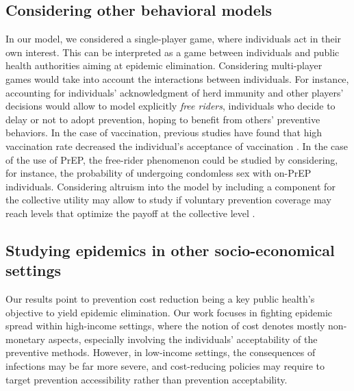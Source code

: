 \subsection{Considering other behavioral models}
In our model, we considered a single-player game, where individuals act in their own interest. This can be interpreted as a game between individuals and public health authorities aiming at epidemic elimination. Considering multi-player games would take into account the interactions between individuals. For instance, accounting for individuals' acknowledgment of herd immunity and other players' decisions would allow to model explicitly \textit{free riders}, individuals who decide to delay or not to adopt prevention, hoping to benefit from others' preventive behaviors. In the case of vaccination, previous studies have found that high vaccination rate decreased the individual's acceptance of vaccination \cite[]{Ibuka2014}. In the case of the use of PrEP, the free-rider phenomenon could be studied by considering, for instance, the probability of undergoing condomless sex with on-PrEP individuals. Considering altruism into the model by including a component for the collective utility may allow to study if voluntary prevention coverage may reach levels that optimize the payoff at the collective level \cite[]{Shim2012}. 





\subsection{Studying epidemics in other socio-economical settings}
Our results point to prevention cost reduction being a key public health's objective to yield epidemic elimination. Our work focuses in fighting epidemic spread within high-income settings, where the notion of cost denotes mostly non-monetary aspects, especially involving the individuals' acceptability of the preventive methods. However, in low-income settings, the consequences of infections may be far more severe, and cost-reducing policies may require to target prevention accessibility rather than prevention acceptability. 

